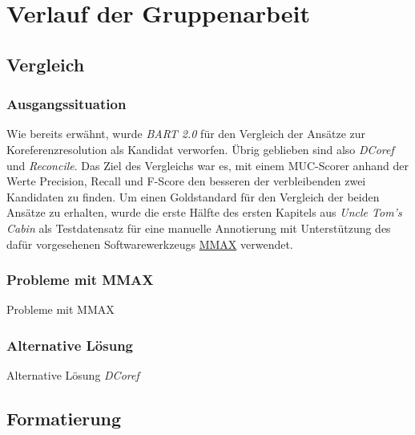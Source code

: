 \documentclass[a4paper,12pt,titlepage=true, ngerman]{scrartcl}
\begin{document}
\section{Verlauf der Gruppenarbeit}\label{Verlauf der Gruppenarbeit} %



\subsection{Vergleich}%



\subsubsection{Ausgangssituation}

Wie bereits erwähnt, wurde \emph{BART 2.0} für den Vergleich der Ansätze zur Koreferenzresolution als Kandidat verworfen. Übrig geblieben sind also \emph{DCoref} und \emph{Reconcile}. Das Ziel des Vergleichs war es, mit einem MUC-Scorer anhand der Werte Precision, Recall und F-Score den besseren der verbleibenden zwei Kandidaten zu finden. Um einen Goldstandard für den Vergleich der beiden Ansätze zu erhalten, wurde die erste Hälfte des ersten Kapitels aus \emph{Uncle Tom's Cabin} \autocite[]{chris_uncle} als Testdatensatz für eine manuelle Annotierung mit Unterstützung des dafür vorgesehenen Softwarewerkzeugs \href{http://mmax2.sourceforge.net/}{MMAX} verwendet. 



\subsubsection{Probleme mit MMAX}%

Probleme mit MMAX



\subsubsection{Alternative Lösung}%

Alternative Lösung \emph{DCoref} \autocite[S. 385 f.]{chris_haghighi}



\subsection{Formatierung}%
\end{document}
